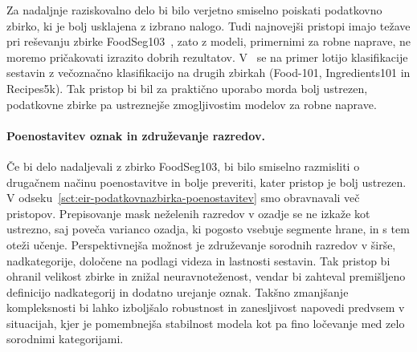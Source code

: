 \documentclass[a4paper,twoside,openright,12pt,slovene]{book}
\begin{document}
        Za nadaljnje raziskovalno delo bi bilo verjetno smiselno poiskati
        podatkovno zbirko, ki je bolj usklajena z izbrano nalogo. Tudi
        najnovejši pristopi imajo težave pri reševanju zbirke
        FoodSeg103~\cite{src:wu2021large, src:lan2023foodsam}, zato z modeli,
        primernimi za robne naprave, ne moremo pričakovati izrazito dobrih
        rezultatov. V~\cite{src:bolanos2017food} se na primer lotijo
        klasifikacije sestavin z večoznačno klasifikacijo na drugih zbirkah
        (Food-101, Ingredients101 in Recipes5k). Tak pristop bi bil za
        praktično uporabo morda bolj ustrezen, podatkovne zbirke pa ustreznejše
        zmogljivostim modelov za robne naprave.
        
        \paragraph{Poenostavitev oznak in združevanje razredov.}

        Če bi delo nadaljevali z zbirko FoodSeg103, bi bilo smiselno razmisliti
        o drugačnem načinu poenostavitve in bolje preveriti, kater pristop je
        bolj ustrezen. V odseku~\ref{sct:eir-podatkovnazbirka-poenostavitev} smo
        obravnavali več pristopov. Prepisovanje mask neželenih razredov v
        ozadje se ne izkaže kot ustrezno, saj poveča varianco ozadja, ki
        pogosto vsebuje segmente hrane, in s tem oteži učenje. Perspektivnejša
        možnost je združevanje sorodnih razredov v širše, nadkategorije,
        določene na podlagi videza in lastnosti sestavin. Tak pristop bi
        ohranil velikost zbirke in znižal neuravnoteženost, vendar bi zahteval
        premišljeno definicijo nadkategorij in dodatno urejanje oznak. Takšno
        zmanjšanje kompleksnosti bi lahko izboljšalo robustnost in zanesljivost
        napovedi predvsem v situacijah, kjer je pomembnejša stabilnost modela
        kot pa fino ločevanje med zelo sorodnimi kategorijami.


        
\end{document}
